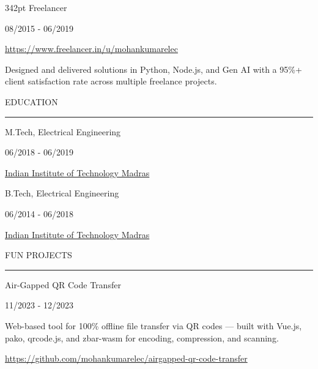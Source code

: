 \documentclass[a4paper]{article}
\newcommand{\mainsection}[1]{%
  \vspace{17pt}%
  {\rubik\fontsize{10.1}{12}\selectfont\color{maintext}\MakeUppercase{#1}\par}%
  \vspace{3pt}%
  {\fontsize{1}{1}\selectfont\color{mainrule}\rule{\linewidth}{0.4pt}\par}%
  \vspace{6pt}%
}
\newcommand{\experienceheader}[2]{%
  {\rubik\fontsize{9.5}{11.5}\selectfont\color{maintext}#1\hfill}%
  {\fontsize{7.6}{9.5}\selectfont\color{maintext}#2\par}%
}
\newcommand{\experiencecompanyonly}[1]{%
  {\rubik\fontsize{8.9}{10.5}\selectfont\color{accent}#1\par}%
  \vspace{2pt}%
}
\newcommand{\experiencebullet}[1]{%
  \hangindent=11pt\hangafter=1%
  {\fontsize{7.6}{9.5}\selectfont\color{maintext}\textbullet\hspace{4pt}#1\par}%
}
\begin{document}
\begin{textblock*}{342pt}
\vspace{12pt}
\experienceheader{Freelancer}{08/2015 - 06/2019}
\experiencecompanyonly{\href{https://www.freelancer.in/u/mohankumarelec}{https://www.freelancer.in/u/mohankumarelec}}

\experiencebullet{Designed and delivered solutions in Python, Node.js, and Gen AI with a 95\%+ client satisfaction rate across multiple freelance projects.}

\mainsection{Education}

\experienceheader{M.Tech, Electrical Engineering}{06/2018 - 06/2019}
\experiencecompanyonly{\href{https://www.iitm.ac.in}{Indian Institute of Technology Madras}}

\vspace{2pt}
\experienceheader{B.Tech, Electrical Engineering}{06/2014 - 06/2018}
\experiencecompanyonly{\href{https://www.iitm.ac.in}{Indian Institute of Technology Madras}}

\mainsection{Fun Projects}

\experienceheader{Air-Gapped QR Code Transfer}{11/2023 - 12/2023}
\vspace{4pt}

{\fontsize{7.6}{9.5}\selectfont\color{maintext}%
Web-based tool for 100\% offline file transfer via QR codes — built with Vue.js, pako, qrcode.js, and zbar-wasm for encoding, compression, and scanning.\par}%
\vspace{3pt}%
{\fontsize{7.6}{9.5}\selectfont\color{maintext}%
\href{https://github.com/mohankumarelec/airgapped-qr-code-transfer}{https://github.com/mohankumarelec/airgapped-qr-code-transfer}\par}%

\end{textblock*}

\mbox{}
\end{document}
